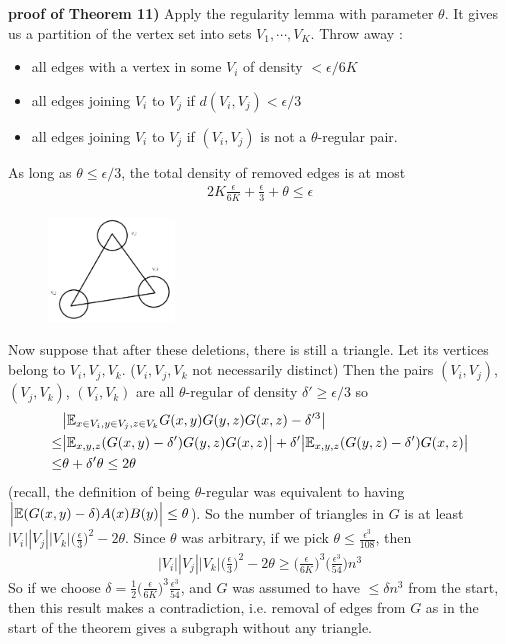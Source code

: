 \documentclass[12pt,a4paper]{report}
\newenvironment{proof}
{\begin{changemargin}{1cm}{0.5cm}
	}%
	{\end{changemargin}
}
\begin{document}
\begin{proof}
\textbf{proof of Theorem 11)} Apply the regularity lemma with parameter $\theta$. It gives us a partition of the vertex set into sets $V_1, \cdots, V_K$. Throw away :
\begin{itemize}
\item all edges with a vertex in some $V_i$ of density $< \epsilon/6K$
\item all edges joining $V_i$ to $V_j$ if $d(V_i, V_j) < \epsilon/3$
\item all edges joining $V_i$ to $V_j$ if $(V_i, V_j)$ is not a $\theta$-regular pair.
\end{itemize}
As long as $\theta \leq \epsilon/3$, the total density of removed edges is at most
\begin{align*}
2K \frac{\epsilon}{6K} + \frac{\epsilon}{3} + \theta \leq \epsilon
\end{align*}
\begin{figure}[h]
	\centering
	\includegraphics[width=0.3\textwidth]{3}
\end{figure}
Now suppose that after these deletions, there is still a triangle. Let its vertices belong to $V_i, V_j, V_k$. ($V_i, V_j, V_k$ not necessarily distinct) Then the pairs $(V_i, V_j)$, $(V_j, V_k)$, $(V_i, V_k)$ are all $\theta$-regular of density $\delta' \geq \epsilon/3$ so
\begin{align*}
&\big| \mathbb{E}_{x\in V_i, y\in V_j, z\in V_k} G(x,y)G(y,z)G(x,z) - \delta'^3 \big| \\
\leq &\big| \mathbb{E}_{x,y,z} (G(x,y)-\delta') G(y,z)G(x,z) \big| + \delta' \big| \mathbb{E}_{x,y,z} (G(y,z)-\delta')G(x,z) \big| \\
\leq & \theta + \delta' \theta \leq 2\theta
\end{align*}
(recall, the definition of being $\theta$-regular was equivalent to having $\Big| \mathbb{E}(G(x,y)-\delta) A(x)B(y)  \Big| \leq \theta$). So the number of triangles in $G$ is at least $|V_i||V_j||V_k| \Big( \frac{\epsilon}{3} \Big)^2 - 2\theta$. Since $\theta$ was arbitrary, if we pick $\theta \leq \frac{\epsilon^3}{108}$, then 
\begin{align*}
|V_i||V_j||V_k| \Big( \frac{\epsilon}{3} \Big)^2 - 2\theta \geq \Big( \frac{\epsilon}{6K} \Big)^3 \Big( \frac{\epsilon^3}{54} \Big) n^3
\end{align*}
So if we choose $\delta = \frac{1}{2 }\Big( \frac{\epsilon}{6K} \Big)^3 \frac{\epsilon^3}{54}$, and $G$ was assumed to have $\leq \delta n^3$ from the start, then this result makes a contradiction, i.e. removal of edges from $G$ as in the start of the theorem gives a subgraph without any triangle.

\eop
\end{proof}
\s
\end{document}
